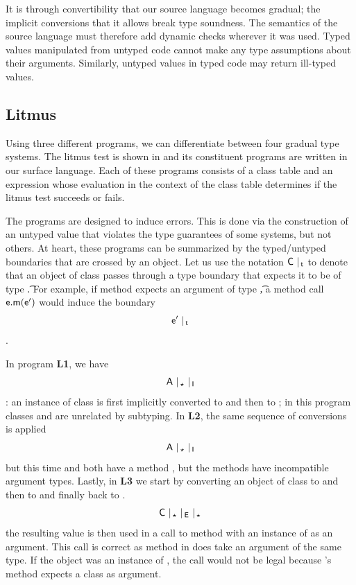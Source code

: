 \documentclass[USenglish]{tex/lipics-v2016}
\begin{document}
It is through convertibility that our source language becomes gradual; the
implicit conversions that it allows break type soundness. The semantics of the
source language must therefore add dynamic checks wherever it was used. 
Typed values manipulated from untyped code cannot make any type assumptions
about their arguments. Similarly, untyped values in typed code may return ill-typed
values. 


\subsection{Litmus}

Using three different programs, we can differentiate between four gradual
type systems. The litmus test is shown in  and its
constituent programs are written in our surface language.  Each of these
programs consists of a class table and an expression whose evaluation in
the context of the class table determines if the litmus test succeeds or
fails.

The programs are designed to induce errors.  This is done via the
construction of an untyped value that violates the type guarantees of some
systems, but not others.  At heart, these programs can be summarized by the
typed/untyped boundaries that are crossed by an object. Let us use the
notation $\C ~\vert_{\,\t}$ to denote that an object of class \C passes
through a type boundary that expects it to be of type \t. For example,
if method \m expects an argument of type \t, a method call $\e.\m(\ep)$ would
induce the boundary \[\ep ~\vert_{\,\t}\]. 

In program {\bf L1}, we have \[{\sf{A}} ~\vert_{\,\star} ~ \vert_{\,{\sf{I}}}\]: an instance of 
class \A is first implicitly converted to \any and then to \I; in this program
classes \A and \I are unrelated by subtyping. In {\bf L2}, the same sequence
of conversions is applied
\[{\sf{A}}~ \vert_{\,\star} ~ \vert_{\,{\sf{I}}}\] but this time \A and \I both have a
method \m, but the methods have incompatible argument types.  Lastly, in
{\bf L3} we start by converting an object of class \C to \any and then to \E
and finally back to \any.
\[\C~ \vert_{\,\any}~\vert_{\,\E}~\vert_{\,\any}\]
the resulting value is then used in a call to method \m with an instance of
\C as an argument. This call is correct as method \m in \C does take an
argument of the same type. If the object was an instance of \E, the call
would not be legal because \E's method \m expects a class \D as argument.
\end{document}
